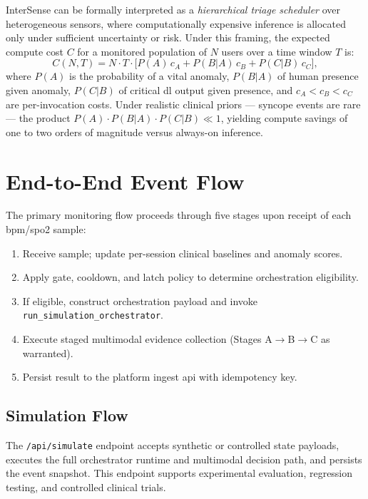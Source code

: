 \documentclass[10pt,twocolumn,a4paper]{article}
\begin{document}
InterSense can be formally interpreted as a \emph{hierarchical triage
scheduler} over heterogeneous sensors, where computationally expensive
inference is allocated only under sufficient uncertainty or risk.
Under this framing, the expected compute cost $C$ for a monitored
population of $N$ users over a time window $T$ is:
\begin{equation}
  C(N, T) = N \cdot T \cdot \bigl[P(A)\,c_A
                              + P(B|A)\,c_B
                              + P(C|B)\,c_C\bigr],
  \label{eq:cost}
\end{equation}
where $P(A)$ is the probability of a vital anomaly, $P(B|A)$ of human
presence given anomaly, $P(C|B)$ of critical \gls{dl} output given
presence, and $c_A < c_B < c_C$ are per-invocation costs.  Under
realistic clinical priors — syncope events are rare — the product
$P(A)\cdot P(B|A)\cdot P(C|B) \ll 1$, yielding compute savings of one
to two orders of magnitude versus always-on inference.

\section{End-to-End Event Flow}

The primary monitoring flow proceeds through five stages upon receipt
of each \gls{bpm}/\gls{spo2} sample:
\begin{enumerate}
  \item Receive sample; update per-session clinical baselines and
        anomaly scores.
  \item Apply gate, cooldown, and latch policy to determine
        orchestration eligibility.
  \item If eligible, construct orchestration payload and invoke
        \texttt{run\_simulation\_orchestrator}.
  \item Execute staged multimodal evidence collection
        (Stages A$\rightarrow$B$\rightarrow$C as warranted).
  \item Persist result to the platform ingest \gls{api} with
        idempotency key.
\end{enumerate}

\subsection{Simulation Flow}

The \texttt{/api/simulate} endpoint accepts synthetic or controlled
state payloads, executes the full orchestrator runtime and multimodal
decision path, and persists the event snapshot.  This endpoint
supports experimental evaluation, regression testing, and controlled
clinical trials.
\end{document}

